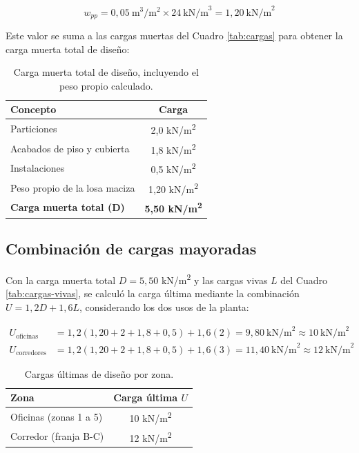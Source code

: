 ﻿\documentclass[12pt,letterpaper]{article}
\begin{document}
\begin{equation}
w_{pp} = 0{,}05 \ \text{m}^3/\text{m}^2 \times 24 \ \text{kN/m}^3 = 1{,}20 \ \text{kN/m}^2
\end{equation}

Este valor se suma a las cargas muertas del Cuadro \ref{tab:cargas} para obtener la carga muerta total de diseño:

\begin{table}[H]
    \centering
    \begin{tabular}{>{\raggedright\arraybackslash}p{7cm} c}
        \toprule
        Concepto & Carga \\
        \midrule
        Particiones & 2,0 kN/m\textsuperscript{2} \\
        Acabados de piso y cubierta & 1,8 kN/m\textsuperscript{2} \\
        Instalaciones & 0,5 kN/m\textsuperscript{2} \\
        Peso propio de la losa maciza & 1,20 kN/m\textsuperscript{2} \\
        \midrule
        \textbf{Carga muerta total (D)} & \textbf{5,50 kN/m\textsuperscript{2}} \\
        \bottomrule
    \end{tabular}
    \caption{Carga muerta total de diseño, incluyendo el peso propio calculado.}
    \label{tab:carga-muerta-total}
\end{table}

\subsection{Combinación de cargas mayoradas}

Con la carga muerta total $D = 5{,}50$ kN/m\textsuperscript{2} y las cargas vivas $L$ del Cuadro \ref{tab:cargas-vivas}, se calculó la carga última mediante la combinación $U = 1{,}2D + 1{,}6L$, considerando los dos usos de la planta:

\begin{align*}
U_{\text{oficinas}} &= 1{,}2(1{,}20+2+1{,}8+0{,}5) + 1{,}6(2) = 9{,}80 \ \text{kN/m}^2 \approx 10 \ \text{kN/m}^2 \\
U_{\text{corredores}} &= 1{,}2(1{,}20+2+1{,}8+0{,}5) + 1{,}6(3) = 11{,}40 \ \text{kN/m}^2 \approx 12 \ \text{kN/m}^2
\end{align*}

\begin{table}[H]
    \centering
    \begin{tabular}{>{\raggedright\arraybackslash}p{7cm} c}
        \toprule
        Zona & Carga última $U$ \\
        \midrule
        Oficinas (zonas 1 a 5) & 10 kN/m\textsuperscript{2} \\
        Corredor (franja B-C) & 12 kN/m\textsuperscript{2} \\
        \bottomrule
    \end{tabular}
    \caption{Cargas últimas de diseño por zona.}
    \label{tab:carga-ultima}
\end{table}
\end{document}
